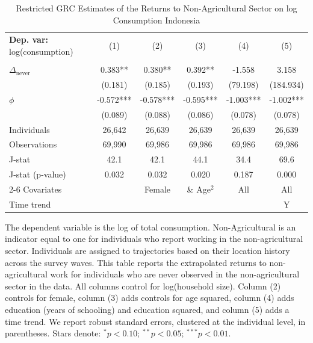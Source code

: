 \begin{table}[htbp] \centering \begin{threeparttable}
 \caption{Restricted GRC Estimates of the Returns to Non-Agricultural Sector on log Consumption Indonesia} 
 \label{tab:GRC_IDN_consumption_nonag_unb} 
\begin{tabular}{l ccccc} \toprule  \textbf{Dep. var:}  log(consumption) 
                    &\multicolumn{1}{c}{(1)}   &\multicolumn{1}{c}{(2)}   &\multicolumn{1}{c}{(3)}   &\multicolumn{1}{c}{(4)}   &\multicolumn{1}{c}{(5)}   \\
                    &               &               &               &               &               \\
\addlinespace
$\Delta_{\text{never}}$&    0.383** &       0.380** &       0.392** &      -1.558   &       3.158   \\
                    &     (0.181)   &     (0.185)   &     (0.193)   &    (79.198)   &   (184.934)   \\
\addlinespace
$\phi$              &      -0.572***&      -0.578***&      -0.595***&      -1.003***&      -1.002***\\
                    &     (0.089)   &     (0.088)   &     (0.086)   &     (0.078)   &     (0.078)   \\
\addlinespace
Individuals         &      26,642   &      26,639   &      26,639   &      26,639   &      26,639   \\
Observations        &      69,990   &      69,986   &      69,986   &      69,986   &      69,986   \\
J-stat              &        42.1   &        42.1   &        44.1   &        34.4   &        69.6   \\
J-stat (p-value)    &       0.032   &       0.032   &       0.020   &       0.187   &       0.000   \\
\cmidrule{2-6} Covariates & & Female & \& Age$^2$ & All & All  \\ Time trend & & & & & Y \\ \bottomrule \end{tabular} \begin{tablenotes} \footnotesize \item{The dependent variable is the log of total consumption. Non-Agricultural is an indicator equal to one for individuals who report working in the non-agricultural sector. Individuals are assigned to trajectories based on their location history across the survey waves. This table reports the extrapolated returns to non-agricultural work for individuals who are never observed in the non-agricultural sector in the data. All columns control for log(household size). Column (2) controls for female, column (3) adds controls for age squared, column (4) adds education (years of schooling) and education squared, and column (5) adds a time trend. We report robust standard errors, clustered at the individual level, in parentheses. Stars denote: $^{*} p<0.10$; $^{**} p<0.05$; $^{***} p<0.01$.} \end{tablenotes} \end{threeparttable} \end{table}

